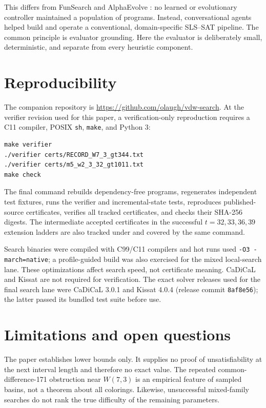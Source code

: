 \documentclass[11pt]{article}
\newcommand{\repo}{\url{https://github.com/olaugh/vdw-search}}
\begin{document}
This differs from FunSearch \cite{romeraparedes2024} and AlphaEvolve
\cite{novikov2025}: no learned or evolutionary controller maintained a
population of programs.  Instead, conversational agents helped build and
operate a conventional, domain-specific SLS--SAT pipeline.  The common
principle is evaluator grounding.  Here the evaluator is deliberately small,
deterministic, and separate from every heuristic component.

\section{Reproducibility}
\label{sec:reproducibility}

The companion repository is \repo.  At the verifier revision used for this
paper, a verification-only reproduction requires a C11 compiler, POSIX
\texttt{sh}, \texttt{make}, and Python 3:
\begin{verbatim}
make verifier
./verifier certs/RECORD_W7_3_gt344.txt
./verifier certs/m5_w2_3_32_gt1011.txt
make check
\end{verbatim}
The final command rebuilds dependency-free programs, regenerates independent
test fixtures, runs the verifier and incremental-state tests, reproduces
published-source certificates, verifies all tracked certificates, and checks
their SHA-256 digests.  The intermediate accepted certificates in the
successful \(t=32,33,36,39\) extension ladders are also tracked under
 and covered by the same command.

Search binaries were compiled with C99/C11 compilers and hot runs used
\texttt{-O3 -march=native}; a profile-guided build was also exercised for
the mixed local-search lane.  These optimizations affect search speed, not
certificate meaning.  CaDiCaL and Kissat are not required for verification.
The exact solver releases used for the final search lane were CaDiCaL 3.0.1
and Kissat 4.0.4 (release commit \texttt{8af8e56}); the latter passed its
bundled test suite before use.

\section{Limitations and open questions}

The paper establishes lower bounds only.  It supplies no proof of
unsatisfiability at the next interval length and therefore no exact value.
The repeated common-difference-171 obstruction near \(W(7,3)\) is an
empirical feature of sampled basins, not a theorem about all colorings.
Likewise, unsuccessful mixed-family searches do not rank the true difficulty
of the remaining parameters.
\end{document}
